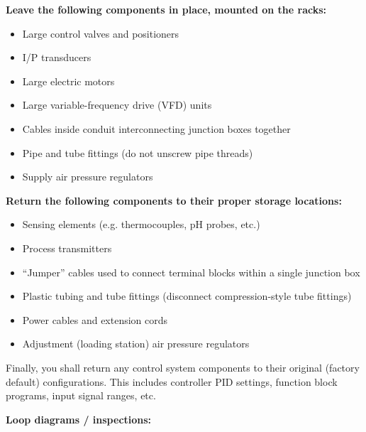 \vskip 10pt

\indent
{\bf Leave the following components in place, mounted on the racks:}

\begin{itemize}
\item Large control valves and positioners
\item I/P transducers
\item Large electric motors
\item Large variable-frequency drive (VFD) units
\item Cables inside conduit interconnecting junction boxes together
\item Pipe and tube fittings (do not unscrew pipe threads)
\item Supply air pressure regulators
\end{itemize}

\vskip 10pt

\indent
{\bf Return the following components to their proper storage locations:}

\begin{itemize}
\item Sensing elements (e.g. thermocouples, pH probes, etc.)
\item Process transmitters
\item ``Jumper'' cables used to connect terminal blocks within a single junction box
\item Plastic tubing and tube fittings (disconnect compression-style tube fittings)
\item Power cables and extension cords
\item Adjustment (loading station) air pressure regulators
\end{itemize}

\vskip 10pt

Finally, you shall return any control system components to their original (factory default) configurations.  This includes controller PID settings, function block programs, input signal ranges, etc.
















\noindent
{\bf Loop diagrams / inspections:}

